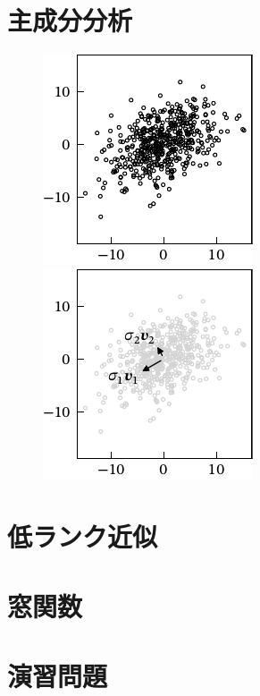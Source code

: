 \documentclass[../../main]{subfiles}
\begin{document}
\begin{subappendices}
\section{主成分分析}
\begin{figure}[htbp]
  \begin{minipage}{\linewidth/2}
    \centering
    \includegraphics{scatter.pdf}
  \end{minipage}%
  \begin{minipage}{\linewidth/2}
    \centering
    \includegraphics{pca.pdf}
  \end{minipage}
\end{figure}

\section{低ランク近似}
\section{窓関数}
\end{subappendices}

\section*{演習問題}
\end{document}
